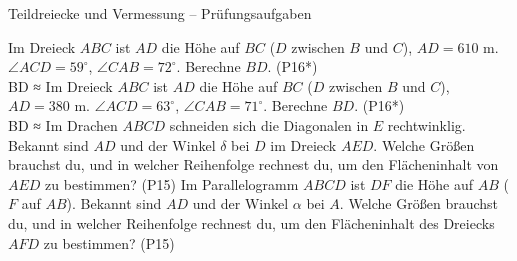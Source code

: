 \begin{aufgabe}{Teildreiecke und Vermessung – Prüfungsaufgaben}
\begin{teile}
\steil Im Dreieck $ABC$ ist $AD$ die Höhe auf $BC$ ($D$ zwischen $B$ und $C$), $AD = 610$ m. $\angle ACD = 59^\circ$, $\angle CAB = 72^\circ$. Berechne $BD$. \hfill (P16*) \\ BD ≈ \leerfeld[m]
\steil Im Dreieck $ABC$ ist $AD$ die Höhe auf $BC$ ($D$ zwischen $B$ und $C$), $AD = 380$ m. $\angle ACD = 63^\circ$, $\angle CAB = 71^\circ$. Berechne $BD$. \hfill (P16*) \\ BD ≈ \leerfeld[m]
\teil Im Drachen $ABCD$ schneiden sich die Diagonalen in $E$ rechtwinklig. Bekannt sind $AD$ und der Winkel $\delta$ bei $D$ im Dreieck $AED$. Welche Größen brauchst du, und in welcher Reihenfolge rechnest du, um den Flächeninhalt von $AED$ zu bestimmen? \hfill (P15)
\teil Im Parallelogramm $ABCD$ ist $DF$ die Höhe auf $AB$ ($F$ auf $AB$). Bekannt sind $AD$ und der Winkel $\alpha$ bei $A$. Welche Größen brauchst du, und in welcher Reihenfolge rechnest du, um den Flächeninhalt des Dreiecks $AFD$ zu bestimmen? \hfill (P15)
\end{teile}
\end{aufgabe}

\medskip
{}
